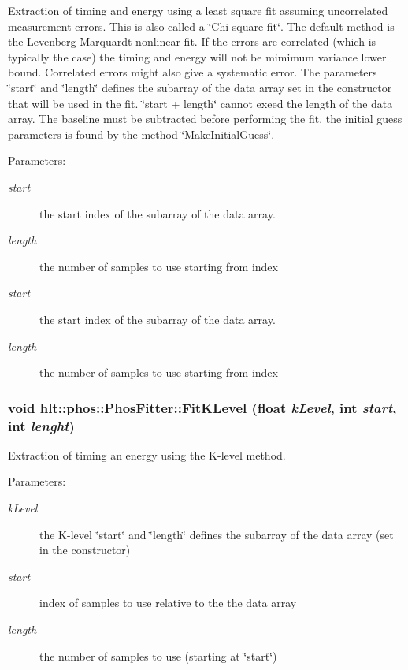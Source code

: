Extraction of timing and energy using a least square fit assuming uncorrelated measurement errors. This is also called a \char`\"{}Chi square fit\char`\"{}. The default method is the Levenberg Marquardt nonlinear fit. If the errors are correlated (which is typically the case) the timing and energy will not be mimimum variance lower bound. Correlated errors might also give a systematic error. The parameters \char`\"{}start\char`\"{} and \char`\"{}length\char`\"{} defines the subarray of the data array set in the constructor that will be used in the fit. \char`\"{}start + length\char`\"{} cannot exeed the length of the data array. The baseline must be subtracted before performing the fit. the initial guess parameters is found by the method \char`\"{}Make\-Initial\-Guess\char`\"{}. \begin{Desc}
\item[Parameters:]
\begin{description}
\item[{\em start}]the start index of the subarray of the data array. \item[{\em length}]the number of samples to use starting from index \item[{\em start}]the start index of the subarray of the data array. \item[{\em length}]the number of samples to use starting from index \end{description}
\end{Desc}
\subsubsection{\setlength{\rightskip}{0pt plus 5cm}void hlt::phos::Phos\-Fitter::Fit\-KLevel (float {\em k\-Level}, int {\em start}, int {\em lenght})}\label{classhlt_1_1phos_1_1PhosFitter_a3}


Extraction of timing an energy using the K-level method. \begin{Desc}
\item[Parameters:]
\begin{description}
\item[{\em k\-Level}]the K-level \char`\"{}start\char`\"{} and \char`\"{}length\char`\"{} defines the subarray of the data array (set in the constructor) \item[{\em start}]index of samples to use relative to the the data array \item[{\em length}]the number of samples to use (starting at \char`\"{}start\char`\"{}) \end{description}
\end{Desc}
